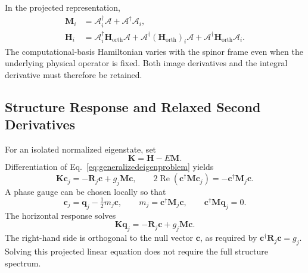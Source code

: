 \documentclass[12pt]{article}
\newcommand{\orth}{\mathrm{orth}}
\begin{document}
In the projected representation,
\begin{equation}
 \begin{aligned}
 \mathbf M_i&=\boldsymbol{\mathcal A}_i^\dagger\boldsymbol{\mathcal A}
             +\boldsymbol{\mathcal A}^\dagger\boldsymbol{\mathcal A}_i,\\
 \mathbf H_i&=\boldsymbol{\mathcal A}_i^\dagger\mathbf H_{\orth}\boldsymbol{\mathcal A}
             +\boldsymbol{\mathcal A}^\dagger(\mathbf H_{\orth})_i\boldsymbol{\mathcal A}
             +\boldsymbol{\mathcal A}^\dagger\mathbf H_{\orth}\boldsymbol{\mathcal A}_i.
 \end{aligned}
 \label{eq:projectedfirstderivatives}
\end{equation}
The computational-basis Hamiltonian varies with the spinor frame even when the underlying physical operator is fixed. Both image derivatives and the integral derivative must therefore be retained.

\subsection{Structure Response and Relaxed Second Derivatives}

For an isolated normalized eigenstate, set
\begin{equation}
 \mathbf K=\mathbf H-E\mathbf M.
 \label{eq:shiftedoperator}
\end{equation}
Differentiation of Eq.~\eqref{eq:generalizedeigenproblem} yields
\begin{equation}
 \mathbf K\mathbf c_j=-\mathbf R_j\mathbf c+g_j\mathbf M\mathbf c,
 \qquad
 2\operatorname{Re}(\mathbf c^\dagger\mathbf M\mathbf c_j)
 =-\mathbf c^\dagger\mathbf M_j\mathbf c.
 \label{eq:rawresponse}
\end{equation}
A phase gauge can be chosen locally so that
\begin{equation}
 \mathbf c_j=\mathbf q_j-\tfrac12m_j\mathbf c,
 \qquad m_j=\mathbf c^\dagger\mathbf M_j\mathbf c,
 \qquad \mathbf c^\dagger\mathbf M\mathbf q_j=0.
 \label{eq:horizontalresponse}
\end{equation}
The horizontal response solves
\begin{equation}
 \boxed{\mathbf K\mathbf q_j
 =-\mathbf R_j\mathbf c+g_j\mathbf M\mathbf c.}
 \label{eq:response}
\end{equation}
The right-hand side is orthogonal to the null vector \(\mathbf c\), as required by \(\mathbf c^\dagger\mathbf R_j\mathbf c=g_j\). Solving this projected linear equation does not require the full structure spectrum.
\end{document}

